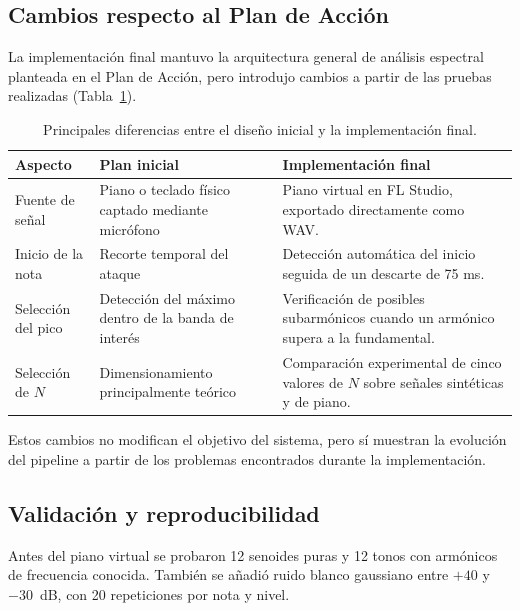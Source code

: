 \documentclass[12pt]{article}
\begin{document}
\subsection{Cambios respecto al Plan de Acción}

La implementación final mantuvo la arquitectura general de análisis espectral
planteada en el Plan de Acción, pero introdujo cambios a partir de las pruebas
realizadas (Tabla~\ref{tab:cambios_plan}).

\begin{table}[ht]
  \centering
  \footnotesize
  \begin{tabular}{p{3.4cm}p{4.3cm}p{5.3cm}}
    \toprule
    \rowcolor{TableHead}
    Aspecto & Plan inicial & Implementación final \\
    \midrule

    Fuente de señal &
    Piano o teclado físico captado mediante micrófono &
    Piano virtual en FL Studio, exportado directamente como WAV. \\

    Inicio de la nota &
    Recorte temporal del ataque &
    Detección automática del inicio seguida de un descarte de 75 ms. \\

    Selección del pico &
    Detección del máximo dentro de la banda de interés &
    Verificación de posibles subarmónicos cuando un armónico supera a la fundamental. \\

    Selección de $N$ &
    Dimensionamiento principalmente teórico &
    Comparación experimental de cinco valores de $N$ sobre señales sintéticas y de piano. \\

    \bottomrule
  \end{tabular}
  \caption{Principales diferencias entre el diseño inicial y la implementación final.}
  \label{tab:cambios_plan}
\end{table}

Estos cambios no modifican el objetivo del sistema, pero sí muestran la evolución
del pipeline a partir de los problemas encontrados durante la implementación.
\subsection{Validación y reproducibilidad}
Antes del piano virtual se probaron 12 senoides puras y 12 tonos con armónicos de
frecuencia conocida. También se añadió ruido blanco gaussiano entre $+40$ y $-30$~dB,
con 20 repeticiones por nota y nivel.
\end{document}
